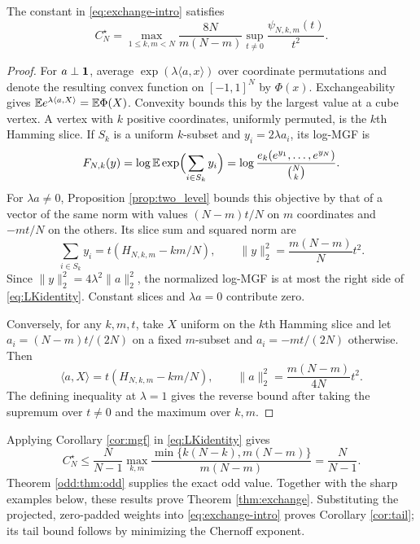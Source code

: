 \begin{proposition}\label{prop:variational}
The constant in \eqref{eq:exchange-intro} satisfies
\begin{equation}\label{eq:LKidentity}
 \boxed{\quad C_N^\star=
 \max_{1\le k,m<N}\frac{8N}{m(N-m)}
 \sup_{t\ne0}\frac{\psi_{N,k,m}(t)}{t^2}.\quad}
\end{equation}
\end{proposition}
\begin{proof}
For $a\perp\mathbf1$, average $\exp(\lambda\langle a,x\rangle)$ over coordinate permutations and denote the resulting convex function on $[-1,1]^N$ by $\Phi(x)$. Exchangeability gives $\mathbb E e^{\lambda\langle a,X\rangle}=\mathbb E\Phi(X)$. Convexity bounds this by the largest value at a cube vertex. A vertex with $k$ positive coordinates, uniformly permuted, is the $k$th Hamming slice. If $S_k$ is a uniform $k$-subset and $y_i=2\lambda a_i$, its log-MGF is
\[
 F_{N,k}(y)=\log\mathbb E\exp\Bigl(\sum_{i\in S_k}y_i\Bigr)
 =\log\frac{e_k(e^{y_1},\ldots,e^{y_N})}{\binom Nk}.
\]
For $\lambda a\ne0$, Proposition \ref{prop:two_level} bounds this objective by that of a vector of the same norm with values $(N-m)t/N$ on $m$ coordinates and $-mt/N$ on the others. Its slice sum and squared norm are
\[
 \sum_{i\in S_k}y_i=t(H_{N,k,m}-km/N),\qquad
 \|y\|_2^2=\frac{m(N-m)}N t^2.
\]
Since $\|y\|_2^2=4\lambda^2\|a\|_2^2$, the normalized log-MGF is at most the right side of \eqref{eq:LKidentity}. Constant slices and $\lambda a=0$ contribute zero.

Conversely, for any $k,m,t$, take $X$ uniform on the $k$th Hamming slice and let $a_i=(N-m)t/(2N)$ on a fixed $m$-subset and $a_i=-mt/(2N)$ otherwise. Then
\[
 \langle a,X\rangle=t(H_{N,k,m}-km/N),\qquad
 \|a\|_2^2=\frac{m(N-m)}{4N}t^2.
\]
The defining inequality at $\lambda=1$ gives the reverse bound after taking the supremum over $t\ne0$ and the maximum over $k,m$.
\end{proof}

Applying Corollary \ref{cor:mgf} in \eqref{eq:LKidentity} gives
\begin{equation}\label{eq:globalC}
 C_N^\star\le\frac{N}{N-1}
 \max_{k,m}\frac{\min\{k(N-k),m(N-m)\}}{m(N-m)}
 =\frac{N}{N-1}.
\end{equation}
Theorem \ref{odd:thm:odd} supplies the exact odd value. Together with the sharp examples below, these results prove Theorem \ref{thm:exchange}. Substituting the projected, zero-padded weights into \eqref{eq:exchange-intro} proves Corollary \ref{cor:tail}; its tail bound follows by minimizing the Chernoff exponent.
